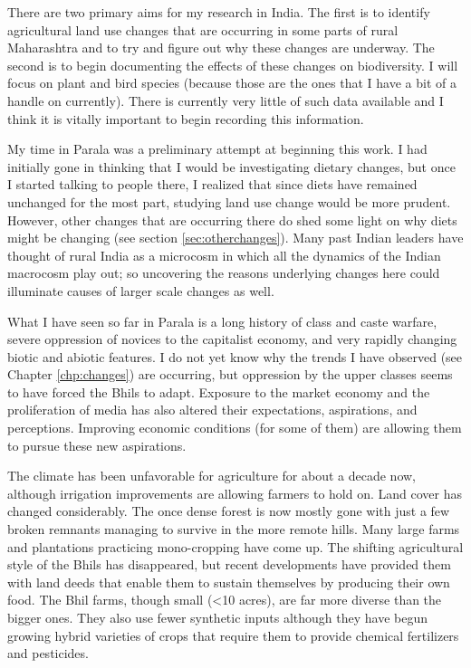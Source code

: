 \documentclass[report.tex]{subfiles}
\begin{document}
There are two primary aims for my research in India. The first is to identify agricultural land use changes that are occurring in some parts of rural Maharashtra and to try and figure out why these changes are underway. The second is to begin documenting the effects of these changes on biodiversity. I will focus on plant and bird species (because those are the ones that I have a bit of a handle on currently). There is currently very little of such data available and I think it is vitally important to begin recording this information.

My time in Parala was a preliminary attempt at beginning this work. I had initially gone in thinking that I would be investigating dietary changes, but once I started talking to people there, I realized that since diets have remained unchanged for the most part, studying land use change would be more prudent. However, other changes that are occurring there do shed some light on why diets might be changing (see section \ref{sec:otherchanges}). Many past Indian leaders have thought of rural India as a microcosm in which all the dynamics of the Indian macrocosm play out; so uncovering the reasons underlying changes here could illuminate causes of larger scale changes as well.

What I have seen so far in Parala is a long history of class and caste warfare, severe oppression of novices to the capitalist economy, and very rapidly changing biotic and abiotic features. I do not yet know why the trends I have observed (see Chapter \ref{chp:changes}) are occurring, but oppression by the upper classes seems to have forced the Bhils to adapt. Exposure to the market economy and the proliferation of media has also altered their expectations, aspirations, and perceptions. Improving economic conditions (for some of them) are allowing them to pursue these new aspirations.

The climate has been unfavorable for agriculture for about a decade now, although irrigation improvements are allowing farmers to hold on. Land cover has changed considerably. The once dense forest is now mostly gone with just a few broken remnants managing to survive in the more remote hills. Many large farms and plantations practicing mono-cropping have come up. The shifting agricultural style of the Bhils has disappeared, but recent developments have provided them with land deeds that enable them to sustain themselves by producing their own food. The Bhil farms, though small (<10 acres), are far more diverse than the bigger ones. They also use fewer synthetic inputs although they have begun growing hybrid varieties of crops that require them to provide chemical fertilizers and pesticides.
\end{document}
